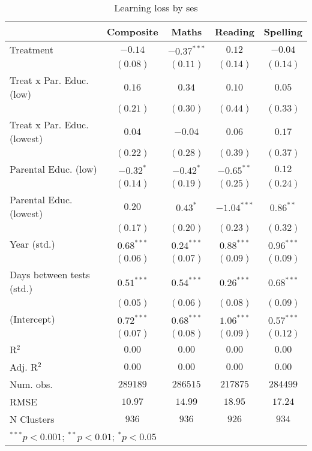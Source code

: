
\begin{table}
\begin{center}
\begin{tabular}{l c c c c}
\hline
 & Composite & Maths & Reading & Spelling \\
\hline
Treatment                   & $-0.14$      & $-0.37^{***}$ & $0.12$        & $-0.04$      \\
                            & $(0.08)$     & $(0.11)$      & $(0.14)$      & $(0.14)$     \\
Treat x Par. Educ. (low)    & $0.16$       & $0.34$        & $0.10$        & $0.05$       \\
                            & $(0.21)$     & $(0.30)$      & $(0.44)$      & $(0.33)$     \\
Treat x Par. Educ. (lowest) & $0.04$       & $-0.04$       & $0.06$        & $0.17$       \\
                            & $(0.22)$     & $(0.28)$      & $(0.39)$      & $(0.37)$     \\
Parental Educ. (low)        & $-0.32^{*}$  & $-0.42^{*}$   & $-0.65^{**}$  & $0.12$       \\
                            & $(0.14)$     & $(0.19)$      & $(0.25)$      & $(0.24)$     \\
Parental Educ. (lowest)     & $0.20$       & $0.43^{*}$    & $-1.04^{***}$ & $0.86^{**}$  \\
                            & $(0.17)$     & $(0.20)$      & $(0.23)$      & $(0.32)$     \\
Year (std.)                 & $0.68^{***}$ & $0.24^{***}$  & $0.88^{***}$  & $0.96^{***}$ \\
                            & $(0.06)$     & $(0.07)$      & $(0.09)$      & $(0.09)$     \\
Days between tests (std.)   & $0.51^{***}$ & $0.54^{***}$  & $0.26^{***}$  & $0.68^{***}$ \\
                            & $(0.05)$     & $(0.06)$      & $(0.08)$      & $(0.09)$     \\
(Intercept)                 & $0.72^{***}$ & $0.68^{***}$  & $1.06^{***}$  & $0.57^{***}$ \\
                            & $(0.07)$     & $(0.08)$      & $(0.09)$      & $(0.12)$     \\
\hline
R$^2$                       & $0.00$       & $0.00$        & $0.00$        & $0.00$       \\
Adj. R$^2$                  & $0.00$       & $0.00$        & $0.00$        & $0.00$       \\
Num. obs.                   & $289189$     & $286515$      & $217875$      & $284499$     \\
RMSE                        & $10.97$      & $14.99$       & $18.95$       & $17.24$      \\
N Clusters                  & $936$        & $936$         & $926$         & $934$        \\
\hline
\multicolumn{5}{l}{\scriptsize{$^{***}p<0.001$; $^{**}p<0.01$; $^{*}p<0.05$}}
\end{tabular}
\caption{Learning loss by ses}
\label{tableses}
\end{center}
\end{table}
